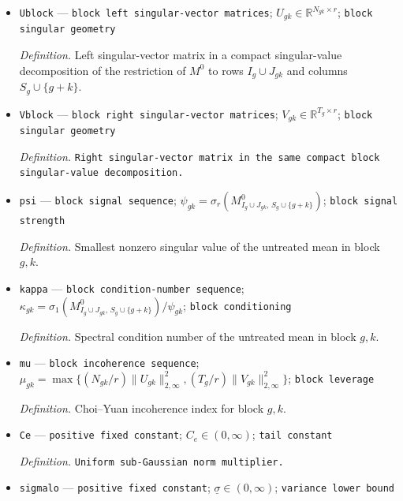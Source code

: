 \documentclass{article}
\begin{document}
\begin{itemize}
  \par\smallskip\noindent\emph{Definition.} \texttt{Number of columns in the Choi-\allowbreak{}-\allowbreak{}Yuan block containing the pre-\allowbreak{}adoption periods and target calendar period.}
  \item \texttt{Ublock} --- \texttt{block left singular-\allowbreak{}vector matrices}; \(U_{gk}\in\mathbb R^{N_{gk}\times r}\); \texttt{block singular geometry}
  \par\smallskip\noindent\emph{Definition.} Left singular-vector matrix in a compact singular-value decomposition of the restriction of \(M^0\) to rows \(I_g\cup J_{gk}\) and columns \(S_g\cup\{g+k\}\).
  \item \texttt{Vblock} --- \texttt{block right singular-\allowbreak{}vector matrices}; \(V_{gk}\in\mathbb R^{T_g\times r}\); \texttt{block singular geometry}
  \par\smallskip\noindent\emph{Definition.} \texttt{Right singular-\allowbreak{}vector matrix in the same compact block singular-\allowbreak{}value decomposition.}
  \item \texttt{psi} --- \texttt{block signal sequence}; \(\psi_{gk}=\sigma_r(M^0_{I_g\cup J_{gk},\,S_g\cup\{g+k\}})\); \texttt{block signal strength}
  \par\smallskip\noindent\emph{Definition.} Smallest nonzero singular value of the untreated mean in block \(g,k\).
  \item \texttt{kappa} --- \texttt{block condition-\allowbreak{}number sequence}; \(\kappa_{gk}=\sigma_1(M^0_{I_g\cup J_{gk},\,S_g\cup\{g+k\}})/\psi_{gk}\); \texttt{block conditioning}
  \par\smallskip\noindent\emph{Definition.} Spectral condition number of the untreated mean in block \(g,k\).
  \item \texttt{mu} --- \texttt{block incoherence sequence}; \(\mu_{gk}=\max\{(N_{gk}/r)\|U_{gk}\|_{2,\infty}^2,(T_g/r)\|V_{gk}\|_{2,\infty}^2\}\); \texttt{block leverage}
  \par\smallskip\noindent\emph{Definition.} Choi--Yuan incoherence index for block \(g,k\).
  \item \texttt{Ce} --- \texttt{positive fixed constant}; \(C_e\in(0,\infty)\); \texttt{tail constant}
  \par\smallskip\noindent\emph{Definition.} \texttt{Uniform sub-\allowbreak{}Gaussian norm multiplier.}
  \item \texttt{sigmalo} --- \texttt{positive fixed constant}; \(\underline\sigma\in(0,\infty)\); \texttt{variance lower bound}

\end{itemize}
\end{document}
